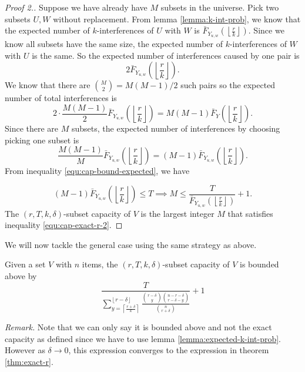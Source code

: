    \begin{proof}[Proof 2.]
        Suppose we have already have $M$ subsets in the universe. Pick two subsets $U,W$ without replacement. From lemma \ref{lemma:k-int-prob}, we know that the expected number of $k$-interferences of $U$ with $W$ is $\bar{F}_{Y_{u,w}}\left(\left\lfloor \frac{r}{k} \right\rfloor\right)$. Since we know all subsets have the same size, the expected number of $k$-interferences of $W$ with $U$ is the same. So the expected number of interferences caused by one pair is
    $$
    2\bar{F}_{Y_{u,w}}\left(\left\lfloor \frac{r}{k} \right\rfloor\right).
    $$
    We know that there are $\binom{M}{2} = M(M-1)/2$ such pairs so the expected number of total interferences is
    $$
    2 \cdot \frac{M(M-1)}{2} \bar{F}_{Y_{u,w}}\left(\left\lfloor \frac{r}{k} \right\rfloor\right)  =  M(M-1) \bar{F}_Y\left(\left\lfloor \frac{r}{k} \right\rfloor\right). 
    $$
    Since there are $M$ subsets, the expected number of interferences by choosing picking one subset is
    $$
    \frac{M(M-1)}{M} \bar{F}_{Y_{u,w}}\left(\left\lfloor \frac{r}{k} \right\rfloor\right)  = (M-1) \bar{F}_{Y_{u,w}}\left(\left\lfloor \frac{r}{k} \right\rfloor\right).
    $$
    From inequality \ref{equ:cap-bound-expected}, we have 

    \begin{equation}
        \label{equ:cap-exact-r-2}
        (M-1) \bar{F}_{Y_{u,w}}\left(\left\lfloor \frac{r}{k} \right\rfloor\right) \le T \implies M \le \frac{T}{\bar{F}_{Y_{u,w}}\left(\left\lfloor \frac{r}{k} \right\rfloor\right)} + 1.
    \end{equation}
The $(r,T,k,\delta)$-subset capacity of $V$ is the largest integer $M$ that satisfies inequality \ref{equ:cap-exact-r-2}.
    \end{proof}

We will now tackle the general case using the same strategy as above. 

\begin{theorem}
    \label{thm:bounded-r}
    Given a set $V$ with $n$ items, the $(r,T,k,\delta)$-subset capacity of $V$ is bounded above by
    \begin{equation*}
     \frac{T}{\sum_{y = \left\lceil \frac{r+\delta}{k} \right\rceil}^{\left\lfloor r - \delta \right\rfloor} \frac{\binom{r-\delta}{y} \binom{n-r-\delta}{r-\delta-y}}{\binom{n}{r+\delta}}} + 1
    \end{equation*}
\end{theorem}

\textit{Remark.} Note that we can only say it is bounded above and not the exact capacity as defined since we have to use lemma \ref{lemma:expected-k-int-prob}. However as $\delta \to 0$, this expression converges to the expression in theorem \ref{thm:exact-r}. 

